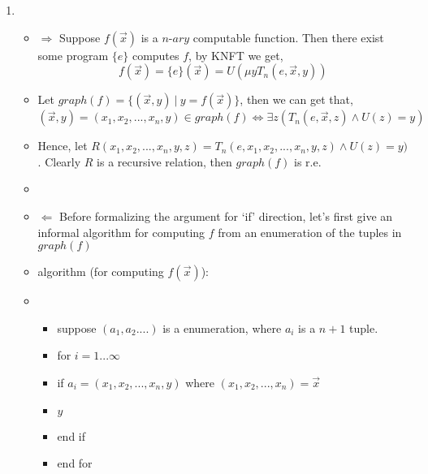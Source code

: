 \documentclass[11pt,twoside]{article}
\begin{document}
\begin{enumerate}[leftmargin=0pt]
\item 
	\begin{itemize}[label ={}]
		\item $\Rightarrow$ Suppose $f(\vec x)$ is a $n$-$ary$ computable function.  Then there exist some program $\{e\}$ computes $f$,  by KNFT we get,
				\[f(\vec x) = \{e\}(\vec x) = U(\mu yT_n(e,\vec x,y))\]
		\item Let $graph(f) = \{(\vec x, y) \ | \ y=f(\vec x)\}$,
		then we can get that, 
				\[ (\vec x, y)= (x_1,x_2,...,x_n, y) \in graph(f) \iff \exists z(T_n(e,\vec x,z) \wedge U(z)=y) \]
		\item Hence, let $R(x_1,x_2,...,x_n, y ,z) = T_n(e,x_1,x_2,...,x_n, y,z) \wedge U(z)=y)$. Clearly $R$ is a recursive relation, then $graph(f)$ is r.e. 
		\item
		\item $\Leftarrow$  Before formalizing the argument for `if' direction,  let's first give an informal algorithm for computing $f$ from an enumeration of the tuples in $graph(f)$  
		\item algorithm (for computing $f(\vec x)$):
		\item \begin{itemize}[label={}]
			\item  suppose $(a_1, a_2....)$ is a enumeration, where $a_i$ is a $n+1$ tuple.
			\item for $i = 1...\infty$
			\item \hskip2pc  if $a_i = (x_1,x_2,...,x_n, y)$ where $  (x_1,x_2,...,x_n) = \vec x$
			\item \hskip4pc 	 $y$
			\item \hskip2pc end if
			\item end for
			\end{itemize}
		

\end{itemize}
\end{enumerate}
\end{document}
